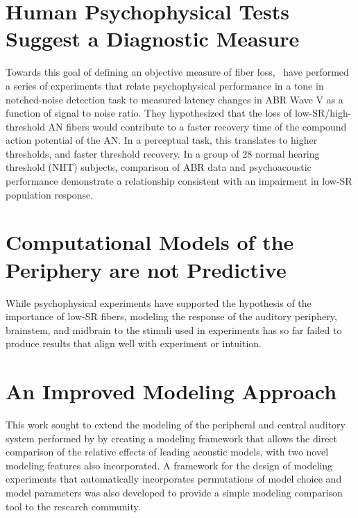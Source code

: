 \section{Human Psychophysical Tests Suggest a Diagnostic Measure}
Towards this goal of defining an objective measure of fiber loss,~\cite{Mehraei2015Individual,Mehraei2016Auditory} have performed a series of experiments that relate psychophysical performance in a tone in notched-noise detection task to measured latency changes in ABR Wave V as a function of signal to noise ratio.  They hypothesized that the loss of low-SR/high-threshold AN fibers would contribute to a faster recovery time of the compound action potential of the AN.  In a perceptual task, this translates to higher thresholds, and faster threshold recovery. In a group of 28 normal hearing threshold (NHT) subjects, comparison of ABR data and psychoacoustic performance demonstrate a relationship consistent with an impairment in low-SR population response.

\section{Computational Models of the Periphery are not Predictive}

While psychophysical experiments have supported the hypothesis of the importance of low-SR fibers, modeling the response of the auditory periphery, brainstem, and midbrain to the stimuli used in experiments has so far failed to produce results that align well with experiment or intuition.

\section{An Improved Modeling Approach} %
\label{sec:an_improved_modeling_approach}
This work sought to extend the modeling of the peripheral and central auditory system performed by \citeauthor{Mehraei2015Auditory} by creating a modeling framework that allows the direct comparison of the relative effects of leading acoustic models, with two novel modeling features also incorporated.  A framework for the design of modeling experiments that automatically incorporates permutations of model choice and model parameters was also developed to provide a simple modeling comparison tool to the research community. 


